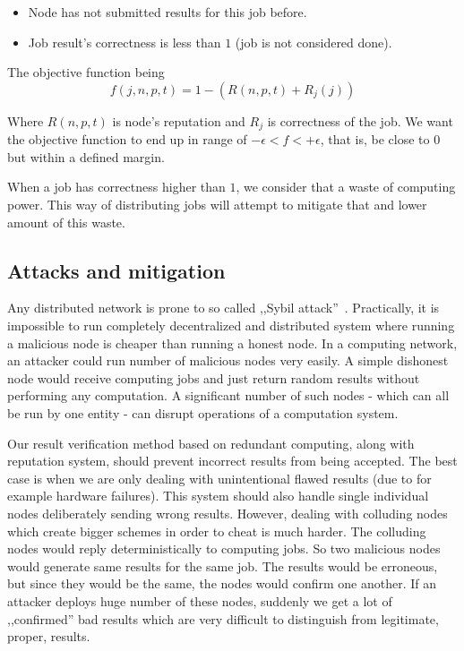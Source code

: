 \begin{itemize}
	\item Node has not submitted results for this job before.
	\item Job result's correctness is less than $1$ (job is not considered done).
\end{itemize}

The objective function being
\begin{equation}
f(j, n, p, t) = 1 - ( R(n, p, t) + R_j(j) )
\end{equation}

Where $R(n, p, t)$ is node's reputation and $R_j$ is correctness of the job. We want the objective function to end up in range of $- \epsilon < f < + \epsilon$, that is, be close to $0$ but within a defined margin.

When a job has correctness higher than $1$, we consider that a waste of computing power. This way of distributing jobs will attempt to mitigate that and lower amount of this waste.

\subsection{Attacks and mitigation}

Any distributed network is prone to so called ,,Sybil attack''~\cite{douceur2002sybil}. Practically, it is impossible to run completely decentralized and distributed system where running a malicious node is cheaper than running a honest node. In a computing network, an attacker could run number of malicious nodes very easily. A simple dishonest node would receive computing jobs and just return random results without performing any computation. A significant number of such nodes - which can all be run by one entity - can disrupt operations of a computation system.

Our result verification method based on redundant computing, along with reputation system, should prevent incorrect results from being accepted. The best case is when we are only dealing with unintentional flawed results (due to for example hardware failures). This system should also handle single individual nodes deliberately sending wrong results. However, dealing with colluding nodes which create bigger schemes in order to cheat is much harder. The colluding nodes would reply deterministically to computing jobs. So two malicious nodes would generate same results for the same job. The results would be erroneous, but since they would be the same, the nodes would confirm one another. If an attacker deploys huge number of these nodes, suddenly we get a lot of ,,confirmed'' bad results which are very difficult to distinguish from legitimate, proper, results.

